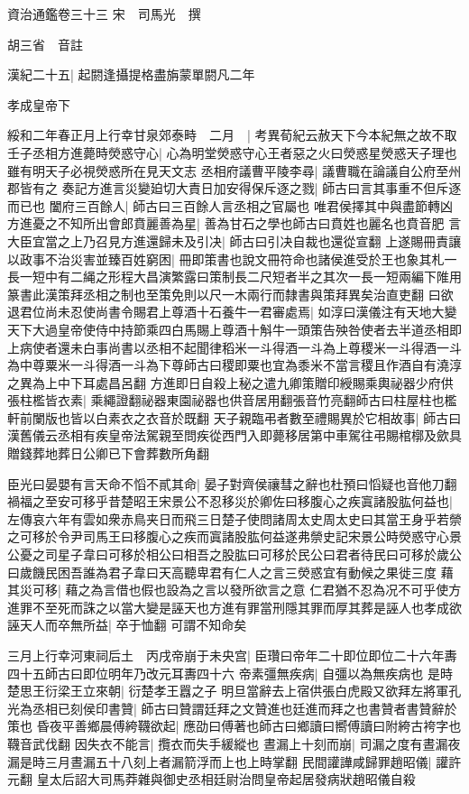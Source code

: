 資治通鑑卷三十三
宋　司馬光　撰

胡三省　音註

漢紀二十五|{
	起閼逢攝提格盡旃蒙單閼凡二年}


孝成皇帝下

綏和二年春正月上行幸甘泉郊泰畤　二月　|{
	考異荀紀云赦天下今本紀無之故不取}
壬子丞相方進薨時熒惑守心|{
	心為明堂熒惑守心王者惡之火曰熒惑星熒惑天子理也雖有明天子必視熒惑所在見天文志}
丞相府議曹平陵李尋|{
	議曹職在論議自公府至州郡皆有之}
奏記方進言災變廹切大責日加安得保斥逐之戮|{
	師古曰言其事重不但斥逐而已也}
闔府三百餘人|{
	師古曰三百餘人言丞相之官屬也}
唯君侯擇其中與盡節轉凶方進憂之不知所出會郎賁麗善為星|{
	善為甘石之學也師古曰賁姓也麗名也賁音肥}
言大臣宜當之上乃召見方進還歸未及引决|{
	師古曰引决自裁也還從宣翻}
上遂賜冊責讓以政事不治災害並臻百姓窮困|{
	冊即策書也說文冊符命也諸侯進受於王也象其札一長一短中有二䋲之形程大昌演繁露曰策制長二尺短者半之其次一長一短兩編下陮用篆書此漢策拜丞相之制也至策免則以尺一木兩行而隸書與策拜異矣治直吏翻}
曰欲退君位尚未忍使尚書令賜君上尊酒十石養牛一君審處焉|{
	如淳曰漢儀注有天地大變天下大過皇帝使侍中持節乘四白馬賜上尊酒十斛牛一頭策告殃咎使者去半道丞相即上病使者還未白事尚書以丞相不起聞律稻米一斗得酒一斗為上尊稷米一斗得酒一斗為中尊粟米一斗得酒一斗為下尊師古曰稷即粟也宜為黍米不當言稷且作酒自有澆淳之異為上中下耳處昌呂翻}
方進即日自殺上秘之遣九卿策贈印綬賜乘輿祕器少府供張柱檻皆衣素|{
	乘繩證翻祕器東園祕器也供音居用翻張音竹亮翻師古曰柱屋柱也檻軒前闌版也皆以白素衣之衣音於既翻}
天子親臨弔者數至禮賜異於它相故事|{
	師古曰漢舊儀云丞相有疾皇帝法駕親至問疾從西門入即薨移居第中車駕往弔賜棺槨及歛具贈錢葬地葬日公卿已下會葬數所角翻}


臣光曰晏嬰有言天命不慆不貳其命|{
	晏子對齊侯禳彗之辭也杜預曰慆疑也音他刀翻}
禍福之至安可移乎昔楚昭王宋景公不忍移災於卿佐曰移腹心之疾寘諸股肱何益也|{
	左傳哀六年有雲如衆赤鳥夹日而飛三日楚子使問諸周太史周太史曰其當王身乎若禜之可移於令尹司馬王曰移腹心之疾而寘諸股肱何益遂弗禜史記宋景公時熒惑守心景公憂之司星子韋曰可移於相公曰相吾之股肱曰可移於民公曰君者待民曰可移於歲公曰歲饑民困吾誰為君子韋曰天高聽卑君有仁人之言三熒惑宜有動候之果徙三度}
藉其災可移|{
	藉之為言借也假也設為之言以發所欲言之意}
仁君猶不忍為况不可乎使方進罪不至死而誅之以當大變是誣天也方進有罪當刑隱其罪而厚其葬是誣人也孝成欲誣天人而卒無所益|{
	卒于恤翻}
可謂不知命矣

三月上行幸河東祠后土　丙戌帝崩于未央宫|{
	臣瓚曰帝年二十即位即位二十六年夀四十五師古曰即位明年乃改元耳夀四十六}
帝素彊無疾病|{
	自彊以為無疾病也}
是時楚思王衍梁王立來朝|{
	衍楚孝王囂之子}
明旦當辭去上宿供張白虎殿又欲拜左將軍孔光為丞相已刻侯印書贊|{
	師古曰贊謂廷拜之文贊進也廷進而拜之也書贊者書贊辭於策也}
昏夜平善鄉晨傅絝韈欲起|{
	應劭曰傅著也師古曰鄉讀曰嚮傅讀曰附絝古袴字也韈音武伐翻}
因失衣不能言|{
	攬衣而失手緩縱也}
晝漏上十刻而崩|{
	司漏之度有晝漏夜漏是時三月晝漏五十八刻上者漏箭浮而上也上時掌翻}
民間讙譁咸歸罪趙昭儀|{
	讙許元翻}
皇太后詔大司馬莽雜與御史丞相廷尉治問皇帝起居發病狀趙昭儀自殺

